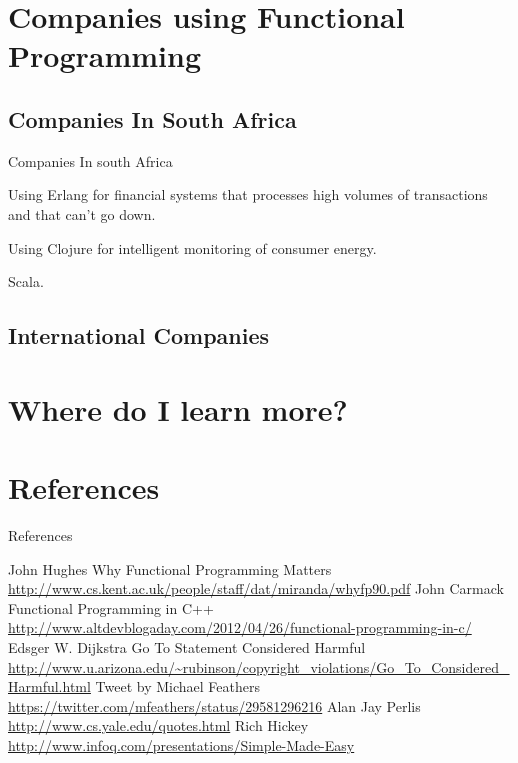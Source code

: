 \documentclass{beamer}
\begin{document}
\section{Companies using Functional Programming}
\subsection{Companies In South Africa}


\begin{frame}{Companies In south Africa}

  \begin{description}[<+->]
  \item[Pattern Matched Technologies] Using Erlang for financial
    systems that processes high volumes of transactions and that can't
    go down.
  \item[Eldo] Using Clojure for intelligent monitoring of consumer
    energy.
  \item[Amazon.com in Cape Town] Scala.
  \end{description}

\end{frame}


\subsection{International Companies}

\section{Where do I learn more?}

\section{References}

\begin{frame}[allowframebreaks]{References}
  \begin{thebibliography}{10}
      John Hughes
      \newblock Why Functional Programming Matters
      \newblock \url{http://www.cs.kent.ac.uk/people/staff/dat/miranda/whyfp90.pdf}
      John Carmack
      \newblock Functional Programming in C++
      \newblock \url{http://www.altdevblogaday.com/2012/04/26/functional-programming-in-c/}
      Edsger W. Dijkstra
      \newblock Go To Statement Considered Harmful
      \newblock \url{http://www.u.arizona.edu/~rubinson/copyright_violations/Go_To_Considered_Harmful.html}
      Tweet by Michael Feathers
      \newblock \url{https://twitter.com/mfeathers/status/29581296216}
      Alan Jay Perlis
      \newblock \url{http://www.cs.yale.edu/quotes.html}
      Rich Hickey
      \newblock \url{http://www.infoq.com/presentations/Simple-Made-Easy}
  \end{thebibliography}
\end{frame}
\end{document}
